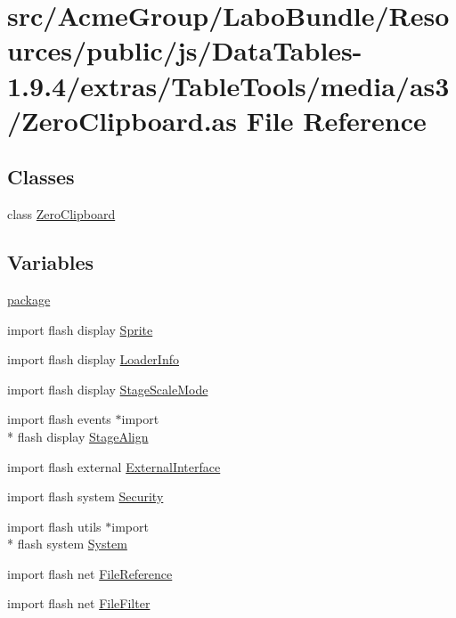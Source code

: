 \hypertarget{_zero_clipboard_8as}{\section{src/\+Acme\+Group/\+Labo\+Bundle/\+Resources/public/js/\+Data\+Tables-\/1.9.4/extras/\+Table\+Tools/media/as3/\+Zero\+Clipboard.as File Reference}
\label{_zero_clipboard_8as}
}
\subsection*{Classes}
\begin{DoxyCompactItemize}
\item 
class \hyperlink{class_zero_clipboard}{Zero\+Clipboard}
\end{DoxyCompactItemize}
\subsection*{Variables}
\begin{DoxyCompactItemize}
\item 
\hyperlink{_zero_clipboard_8as_a5f90b32dbc783ac82e8621cea6b3b3ef}{package}
\item 
import flash display \hyperlink{_zero_clipboard_8as_a042194dccb28a568ca64f8525721c60a}{Sprite}
\item 
import flash display \hyperlink{_zero_clipboard_8as_ad50f418ba9beb1fbb43185baa35ec4a2}{Loader\+Info}
\item 
import flash display \hyperlink{_zero_clipboard_8as_a9712fefc0286413e0d285a5b0fd83376}{Stage\+Scale\+Mode}
\item 
import flash events $\ast$import \\*
flash display \hyperlink{_zero_clipboard_8as_a65934e40e78800e97f0a74d031566cf3}{Stage\+Align}
\item 
import flash external \hyperlink{_zero_clipboard_8as_a8adbb9e92ce78f1cd583ebf4ff65e221}{External\+Interface}
\item 
import flash system \hyperlink{_zero_clipboard_8as_ae6834b84bc690e04dba52c72b66ee901}{Security}
\item 
import flash utils $\ast$import \\*
flash system \hyperlink{_zero_clipboard_8as_aa9096e3fcab84f69b6438f42c99b82a7}{System}
\item 
import flash net \hyperlink{_zero_clipboard_8as_a151f8adb645ca8d486cccdf7d20fa78c}{File\+Reference}
\item 
import flash net \hyperlink{_zero_clipboard_8as_a11e5599edf00e50cbf0be6d87f6b21c6}{File\+Filter}
\end{DoxyCompactItemize}


